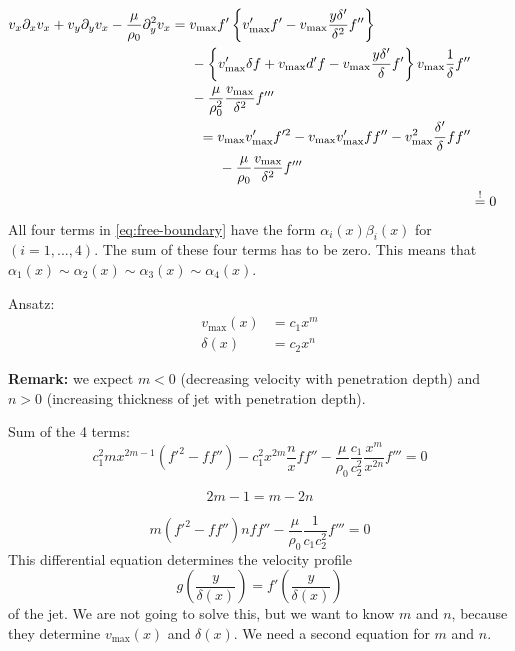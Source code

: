 \begin{align}
\begin{split}
v_x\partial_x v_x+v_y\partial_yv_x-\frac{\mu}{\rho_0}\partial^2_yv_x &= v_\mathrm{max}f'\left\lbrace v'_\mathrm{max}f' - v_\mathrm{max}\frac{y\delta'}{\delta^2}f''\right\rbrace \\
&\hspace{5mm}-\left\lbrace v'_\mathrm{max}\delta f + v_\mathrm{max}d'f-v_\mathrm{max}\frac{y\delta'}{\delta}f'\right\rbrace v_\mathrm{max}\frac{1}{\delta}f'' \\
&\hspace{5mm}-\frac{\mu}{\rho_0^2} \frac{v_\mathrm{max}}{\delta^2}f'''
\end{split}\\
\begin{split}
&= v_\mathrm{max}v'_\mathrm{max}f'^2-v_\mathrm{max}v'_\mathrm{max}ff''-v_\mathrm{max}^2\frac{\delta'}{\delta}ff'' \\
&\hspace{5mm}-\frac{\mu}{\rho_0}\frac{v_\mathrm{max}}{\delta^2}f'''\label{eq:free-boundary}
\end{split} \\
&\overset{!}{=}0
\end{align}
All four terms in \eqref{eq:free-boundary} have the form $\alpha_i(x)\beta_i(x)$ for $(i=1,...,4)$. The sum of these four terms has to be zero. This means that $\alpha_1(x)\sim\alpha_2(x)\sim\alpha_3(x)\sim\alpha_4(x)$.

Ansatz:
\begin{align}
v_\mathrm{max}(x) &= c_1x^m\\
\delta(x) &= c_2 x^n
\end{align}

\begin{framed}
\textbf{Remark:} we expect $m<0$ (decreasing velocity with penetration depth) and $n>0$ (increasing thickness of jet with penetration depth).
\end{framed}

Sum of the 4 terms:
\begin{equation}
c_1^2mx^{2m-1}(f'^2-ff'')-c_1^2x^{2m}\frac{n}{x}ff'' - \frac{\mu}{\rho_0}\frac{c_1}{c_2^2}\frac{x^m}{x^{2n}}f'''=0
\end{equation}

\begin{equation}
2m-1 = m-2n
\end{equation}

\begin{equation}
m(f'^2-ff'')nff''-\frac{\mu}{\rho_0}\frac{1}{c_1c_2^2}f'''=0
\end{equation}
This differential equation determines the velocity profile
\begin{equation}
g\left(\frac{y}{\delta(x)}\right)=f'\left(\frac{y}{\delta(x)}\right)
\end{equation}
of the jet. We are not going to solve this, but we want to know $m$ and $n$, because they determine $v_\mathrm{max}(x)$ and $\delta(x)$. We need a second equation for $m$ and $n$.

